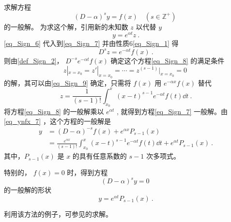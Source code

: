 \begin{example}{}
求解方程
\begin{equation}\label{eq_Sign_7}
(D-\alpha)^sy=f(x) \quad (s\in \mathbb{Z}^{+})~
\end{equation}
的一般解。
为求这个解，引用新的未知数 $z$ 以代替 $y$
\begin{equation}\label{eq_Sign_6}
y=e^{\alpha t}z~.
\end{equation}
\autoref{eq_Sign_6} 代入到\autoref{eq_Sign_7} 并由性质6\autoref{eq_Sign_1} 得
\begin{equation}\label{eq_Sign_8}
D^sz=e^{-\alpha t}f(x)~.
\end{equation}
则由\autoref{def_Sign_2}， $D^{-s}e^{-\alpha t}f(x)$ 确定这个方程\autoref{eq_Sign_8} 的满足条件
\begin{equation}
z|_{x=x_0}=z'|_{x=x_0}=\cdots=z^{(s-1)}|_{x=x_0}=0~
\end{equation}
的解，其可以由\autoref{eq_Sign_9} 确定，只需将 $f(x)$ 用 $e^{-\alpha x}f(x)$ 替代
\begin{equation}
z=\frac{1}{(s-1)!}\int_{x_0}^x(x-t)^{s-1}e^{-\alpha t}f(t)\dd t~.
\end{equation}
将方程\autoref{eq_Sign_8} 的一般解乘以 $e^{\alpha t}$ , 就得到方程\autoref{eq_Sign_7} 一般解。由\autoref{eq_ynfx_7}  ，这个方程的一般解是
\begin{equation}
\begin{aligned}
y&=(D-\alpha)^{-s}f(x)+e^{\alpha x}P_{s-1}(x)\\
&=\frac{e^{\alpha x}}{(s-1)!}\int_{x_0}^x(x-t)^{s-1}e^{-\alpha t}f(t)\dd t+e^{\alpha t}P_{s-1}(x)~.
\end{aligned}
\end{equation}
其中，$P_{s-1}(x)$ 是 $x$ 的具有任意系数的 $s-1$ 次多项式。

特别的， $f(x)=0$ 时，得到方程
\begin{equation}
(D-\alpha)^sy=0~
\end{equation}
的一般解的形状
\begin{equation}
y=e^{\alpha t}P_{s-1}(x)~.
\end{equation}

\end{example}
利用该方法的例子，可参见的求解。
